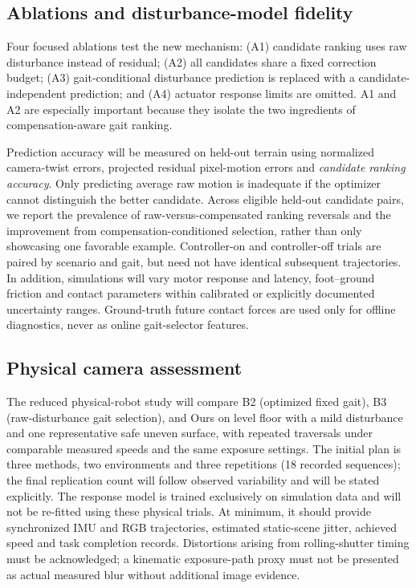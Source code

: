 \subsection{Ablations and disturbance-model fidelity}
Four focused ablations test the new mechanism: (A1) candidate ranking uses raw disturbance instead of residual; (A2) all candidates share a fixed correction budget; (A3) gait-conditional disturbance prediction is replaced with a candidate-independent prediction; and (A4) actuator response limits are omitted. A1 and A2 are especially important because they isolate the two ingredients of compensation-aware gait ranking.

Prediction accuracy will be measured on held-out terrain using normalized camera-twist errors, projected residual pixel-motion errors and \emph{candidate ranking accuracy}. Only predicting average raw motion is inadequate if the optimizer cannot distinguish the better candidate. Across eligible held-out candidate pairs, we report the prevalence of raw-versus-compensated ranking reversals and the improvement from compensation-conditioned selection, rather than only showcasing one favorable example. Controller-on and controller-off trials are paired by scenario and gait, but need not have identical subsequent trajectories. In addition, simulations will vary motor response and latency, foot--ground friction and contact parameters within calibrated or explicitly documented uncertainty ranges. Ground-truth future contact forces are used only for offline diagnostics, never as online gait-selector features.

\subsection{Physical camera assessment}
The reduced physical-robot study will compare B2 (optimized fixed gait), B3 (raw-disturbance gait selection), and Ours on level floor with a mild disturbance and one representative safe uneven surface, with repeated traversals under comparable measured speeds and the same exposure settings. The initial plan is three methods, two environments and three repetitions (18 recorded sequences); the final replication count will follow observed variability and will be stated explicitly. The response model is trained exclusively on simulation data and will not be re-fitted using these physical trials. At minimum, it should provide synchronized IMU and RGB trajectories, estimated static-scene jitter, achieved speed and task completion records. Distortions arising from rolling-shutter timing must be acknowledged; a kinematic exposure-path proxy must not be presented as actual measured blur without additional image evidence.
